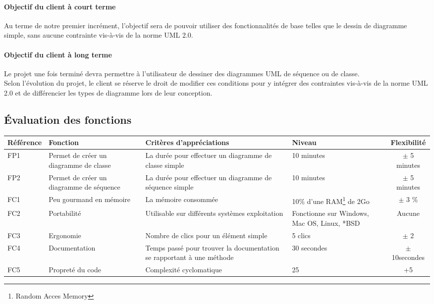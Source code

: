 \documentclass[12pt,a4paper,openany]{article}
\begin{document}
	\paragraph{Objectif du client à court terme} Au terme de notre premier incrément, l'objectif sera
	de pouvoir utiliser des fonctionnalités de base telles que le dessin de diagramme simple, sans aucune
	contrainte vis-à-vis de la norme UML 2.0.
	\paragraph{Objectif du client à long terme}
	Le projet une fois terminé devra permettre à l'utilisateur de dessiner des diagrammes UML de séquence ou de classe.\\
	Selon l'évolution du projet, le client se réserve le droit de modifier ces conditions pour y
	intégrer des contraintes vis-à-vis de la norme UML 2.0 et de différencier les types de diagramme lors de leur conception. 
	
	\subsection{Évaluation des fonctions}
	\begin{tabular}{|p{2cm}|p{3cm}|p{5cm}|p{3cm}|c|}
		\hline
		\textbf{Référence}& \textbf{Fonction} & \textbf{Critères d'appréciations} & \textbf{Niveau} & \textbf{Flexibilité} \\
		\hline
			FP1 & Permet de créer un diagramme de classe & La durée pour effectuer un diagramme de classe simple & 10 minutes & $\pm$ 5 minutes\\
		\hline
			FP2 & Permet de créer un diagramme de séquence & La durée pour effectuer un diagramme de séquence simple & 10 minutes & $\pm$ 5 minutes\\
		\hline
			FC1 & Peu gourmand en mémoire & La mémoire consommée & 10\% d'une RAM\footnote{Random Acces Memory} de 2Go & $\pm$ 3 \%\\
		\hline
			FC2 & Portabilité & Utilisable sur différents systèmes exploitation & Fonctionne sur Windows, Mac OS, Linux, *BSD & Aucune \\
		\hline
			FC3 & Ergonomie & Nombre de clics pour un élément simple & 5 clics & $\pm$ 2\\
		\hline
			FC4 & Documentation & Temps passé pour trouver la documentation se rapportant à une méthode &30 secondes& $\pm$10secondes \\ 
		\hline
			FC5 & Propreté du code & Complexité cyclomatique& 25 & +5\\ 
		\hline
	\end{tabular}
\end{document}
